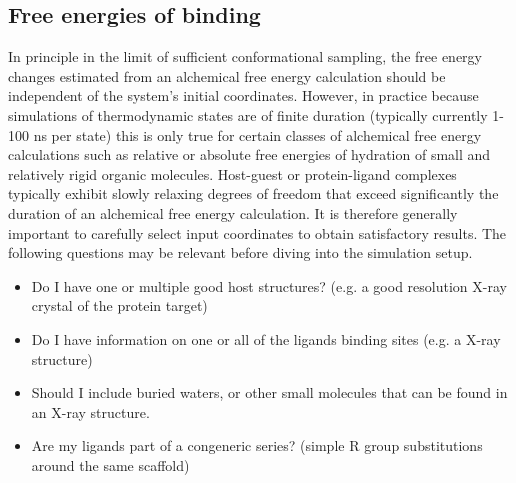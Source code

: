 \documentclass[9pt,bestpractices]{livecoms}
\begin{document}
\subsection{Free energies of binding}
\label{subsec:binding}
In principle in the limit of sufficient conformational sampling, the free energy changes estimated from an alchemical free energy calculation should be independent of the system's initial coordinates. However, in practice because simulations of thermodynamic states are of finite duration (typically currently 1-100 ns per state) this is only true for certain classes of alchemical free energy calculations such as relative or absolute free energies of hydration of small and relatively rigid organic molecules. Host-guest or protein-ligand complexes typically exhibit slowly relaxing degrees of freedom that exceed significantly the duration of an alchemical free energy calculation. It is therefore generally important to carefully select input coordinates to obtain satisfactory results. 
The following questions may be relevant before diving into the simulation setup.
% 
\begin{itemize}
    \item Do I have one or multiple good host structures? (e.g. a good resolution X-ray crystal of the protein target)
    \item Do I have information on one or all of the ligands binding sites (e.g. a X-ray structure)
    \item Should I include buried waters, or other small molecules that can be found in an X-ray structure.
    \item Are my ligands part of a congeneric series? (simple R group substitutions around the same scaffold)
    \end{itemize}
%
\end{document}
